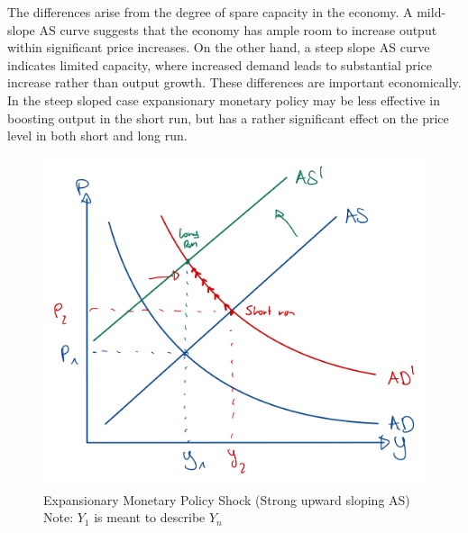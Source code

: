 \documentclass[a4paper,11pt]{article}
\begin{document}
The differences arise from the degree of spare capacity in the economy. A mild-slope AS curve suggests that the economy has ample room to increase output within significant price increases. On the other hand, a steep slope AS curve indicates limited capacity, where increased demand leads to substantial price increase rather than output growth. These differences are important economically. In the steep sloped case expansionary monetary policy may be less effective in boosting output in the short run, but has a rather significant effect on the price level in both short and long run. \\

\begin{figure}[H]
\centering
\includegraphics[scale=0.18]{figures/ASAD_steepslope.png}
\caption{Expansionary Monetary Policy Shock (Strong upward sloping AS) Note: $Y_1$ is meant to describe $Y_n$}
\end{figure}

\pagebreak
\end{document}
